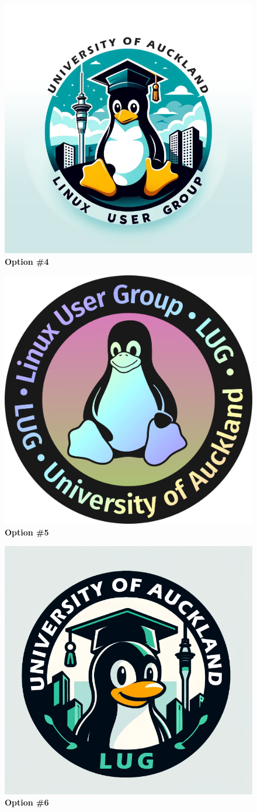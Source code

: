 \documentclass[11pt,fleqn]{article}
\begin{document}
\begin{figure}
  \centering
  \includegraphics[width=0.56\linewidth]{res/4.png}
  \caption*{\Large{\textbf{Option \#4}}}
  \label{fig:optn4}
\end{figure}

\begin{figure}
  \centering
  \includegraphics[width=0.56\linewidth]{res/5-lug-logo-circlified-safe-text.png}
  \caption*{\Large{\textbf{Option \#5}}}
  \label{fig:optn5}
\end{figure}

\begin{figure}
  \centering
  \includegraphics[width=0.56\linewidth]{res/6.png}
  \caption*{\Large{\textbf{Option \#6}}}
  \label{fig:optn5}
\end{figure}
\end{document}
